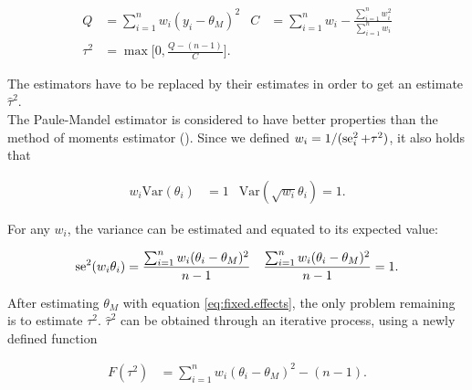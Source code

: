 \documentclass[11pt,a4paper,twoside]{book}\usepackage[]{graphicx}\usepackage[]{color}
\begin{document}
\begin{align}
Q &= \sum_{i = 1}^n w_i(y_i - \theta_M)^2 & C &= \sum_{i = 1}^n w_i - \frac{\sum_{i = 1}^n w_i^2}{\sum_{i = 1}^n w_i} \label{eq:Q.heterogeneity} \\
\tau^2 &= \max\bigg[0, \frac{Q - (n-1)}{C}\bigg]. \label{eq:Tau.definition}
\end{align}

The estimators have to be replaced by their estimates in order to get an estimate $\hat{\tau}^2$.\\
The Paule-Mandel estimator \citep{paulemandel} is considered to have better properties than the method of moments estimator (\eg \citealp{tau.estimator.evaluation}). Since we defined $w_i = 1/(\operatorname{se}_i^2 + \tau^2)$, it also holds that

\begin{align}
w_i \textrm{Var}(\theta_i) &= 1 & \textrm{Var}(\sqrt{w_i}\theta_i) = 1. \nonumber
\end{align}

For any $w_i$, the variance can be estimated and equated to its expected value:

\begin{align}
\operatorname{se}^2(w_i\theta_i) &= \frac{\sum_{i = 1}^n w_i(\theta_i - \theta_M)^2}{n-1} & \frac{\sum_{i = 1}^n w_i(\theta_i - \theta_M)^2}{n-1} = 1. \label{eq:paulemandel}
\end{align}

After estimating $\theta_M$ with equation \eqref{eq:fixed.effects}, the only problem remaining is to estimate $\tau^2$. $\hat{\tau}^2$ can be obtained through an iterative process, using a newly defined function

\begin{align}
F(\tau^2) &= \sum_{i = 1}^n w_i(\theta_i - \theta_M)^2 - (n-1). \nonumber
\end{align}
\end{document}
